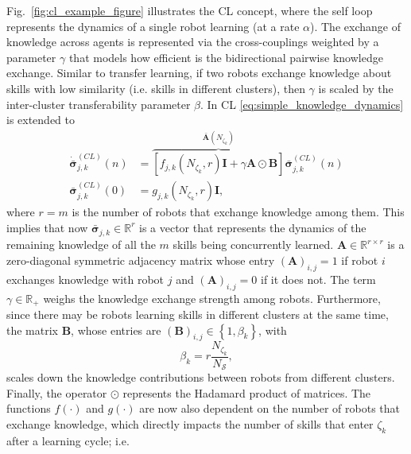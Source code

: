 Fig.~\ref{fig:cl_example_figure} illustrates the CL concept, where the self loop represents the dynamics of a single robot learning (at a rate $\alpha$). The exchange of knowledge across agents is represented via the cross-couplings weighted by a parameter $\gamma$ that models how efficient is the bidirectional pairwise knowledge exchange. Similar to transfer learning, if two robots exchange knowledge about skills with low similarity (i.e. skills in different clusters), then $\gamma$ is scaled by the inter-cluster transferability parameter $\beta$. In CL \eqref{eq:simple_knowledge_dynamics} is extended to 
\begin{subequations}\label{eq:collective_knowledge_dynamics}
	\begin{alignat}{2}
		\dot{\bar{\bm{\sigma}}}^{(CL)}_{j,k}\left(n\right) &= \overbrace{\left[  f_{j,k}\left(N_{\zeta_k},r\right) \bm{I} + \gamma \bm{A} \odot \bm{B}  \right]}^{\bar{\bm{A}}\left(N_{\zeta_k}\right)} \bar{\bm{\sigma}}^{(CL)}_{j,k}\left(n\right)\\
		\bar{\bm{\sigma}}^{(CL)}_{j,k}(0) &= g_{j,k}\left( N_{\zeta_k}, r\right) \bm{I},
	\end{alignat}
\end{subequations}
where $r=m$ is the number of robots that exchange knowledge among them. This implies that now $\bar{\bm{\sigma}}^{}_{j,k} \in \mathbb{R}^r$ is a vector that represents the dynamics of the remaining knowledge of all the $m$ skills being concurrently learned. $\bm{A} \in \mathbb{R}^{r \times r}$ is a zero-diagonal symmetric adjacency matrix whose entry $(\bm{A})_{i,j} = 1$ if robot $i$ exchanges knowledge with robot $j$ and $(\bm{A})_{i,j} = 0$ if it does not. The term $\gamma \in \mathbb{R}_+ $ weighs the knowledge exchange strength among robots. Furthermore, since there may be robots learning skills in different clusters at the same time, the matrix $\bm{B}$, whose entries are $\left(\bm{B}\right)_{i,j} \in \left \lbrace 1, \beta_{k} \right \rbrace$, with
\begin{equation}
	\beta_{k} = r\frac{ N_{\zeta_k}}{N_\mathcal{S}}, 
\end{equation}
scales down the knowledge contributions between robots from different clusters. Finally, the operator $\odot$ represents the Hadamard product of matrices. The functions $ f(\cdot)$ and $g(\cdot)$ are now also dependent on the number of robots that exchange knowledge, which directly impacts the number of skills that enter $\zeta_k$ after a learning cycle; i.e.
